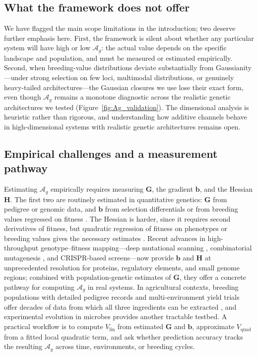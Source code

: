 \documentclass[9pt,twocolumn,twoside,lineno]{gsajnl}
\newcommand{\vect}[1]{\boldsymbol{#1}}
\newcommand{\mat}[1]{\mathbf{#1}}
\newcommand{\Ag}{\ensuremath{\mathcal{A}_{g}}\xspace}
\newcommand{\Vlin}{\ensuremath{V_{\text{lin}}}\xspace}
\newcommand{\Vquad}{\ensuremath{V_{\text{quad}}}\xspace}
\begin{document}
\subsection{What the framework does not offer}

We have flagged the main scope limitations in the introduction; two deserve further emphasis here. First, the framework is silent about whether any particular system will have high or low \Ag: the actual value depends on the specific landscape and population, and must be measured or estimated empirically. Second, when breeding-value distributions deviate substantially from Gaussianity---under strong selection on few loci, multimodal distributions, or genuinely heavy-tailed architectures---the Gaussian closures we use lose their exact form, even though \Ag remains a monotone diagnostic across the realistic genetic architectures we tested (Figure~\ref{fig:Ag_validation}). The dimensional analysis is heuristic rather than rigorous, and understanding how additive channels behave in high-dimensional systems with realistic genetic architectures remains open.

\subsection{Empirical challenges and a measurement pathway}

Estimating \Ag empirically requires measuring $\mat{G}$, the gradient $\vect{b}$, and the Hessian $\mat{H}$. The first two are routinely estimated in quantitative genetics: $\mat{G}$ from pedigree or genomic data, and $\vect{b}$ from selection differentials or from breeding values regressed on fitness \citep{LandeArnold1983}. The Hessian is harder, since it requires second derivatives of fitness, but quadratic regression of fitness on phenotypes or breeding values gives the necessary estimates \citep{PhillipsArnold1989, BlowsBrooks2003}. Recent advances in high-throughput genotype--fitness mapping---deep mutational scanning \citep{Fowler2014}, combinatorial mutagenesis \citep{Starr2020}, and CRISPR-based screens---now provide $\vect{b}$ and $\mat{H}$ at unprecedented resolution for proteins, regulatory elements, and small genome regions; combined with population-genetic estimates of $\mat{G}$, they offer a concrete pathway for computing \Ag in real systems. In agricultural contexts, breeding populations with detailed pedigree records and multi-environment yield trials offer decades of data from which all three ingredients can be extracted \citep{CooperMessina2014}, and experimental evolution in microbes \citep{Lenski2017} provides another tractable testbed. A practical workflow is to compute $\Vlin$ from estimated $\mat{G}$ and $\vect{b}$, approximate $\Vquad$ from a fitted local quadratic term, and ask whether prediction accuracy tracks the resulting \Ag across time, environments, or breeding cycles.
\end{document}
